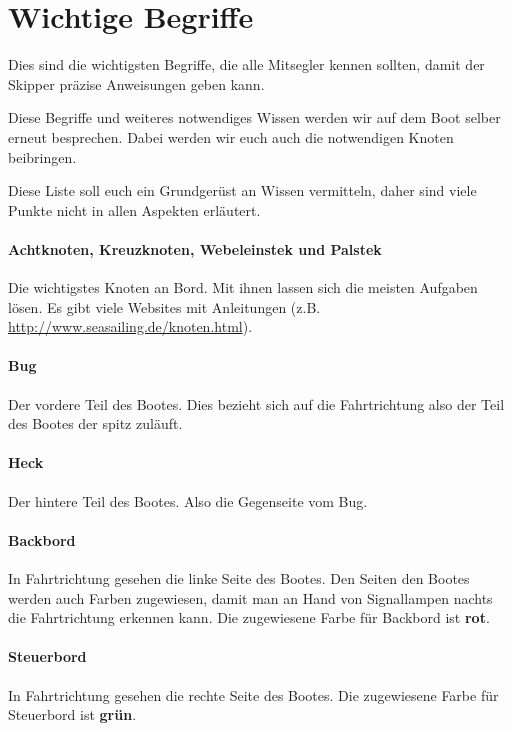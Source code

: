 \documentclass[12pt]{article}
\begin{document}

\section{Wichtige Begriffe}
Dies sind die wichtigsten Begriffe, die alle Mitsegler kennen sollten, damit der Skipper präzise Anweisungen geben kann.

Diese Begriffe und weiteres notwendiges Wissen werden wir auf dem Boot selber erneut besprechen. Dabei werden wir euch auch die notwendigen Knoten beibringen.

Diese Liste soll euch ein Grundgerüst an Wissen vermitteln, daher sind viele Punkte nicht in allen Aspekten erläutert.

\paragraph{Achtknoten, Kreuzknoten, Webeleinstek und Palstek}
Die wichtigstes Knoten an Bord. Mit ihnen lassen sich die meisten Aufgaben lösen.
Es gibt viele Websites mit Anleitungen (z.B. \href{http://www.seasailing.de/knoten.html}{http://www.seasailing.de/knoten.html}).

\paragraph{Bug}
Der vordere Teil des Bootes. Dies bezieht sich auf die Fahrtrichtung also der Teil des Bootes der spitz zuläuft.

\paragraph{Heck}
Der hintere Teil des Bootes. Also die Gegenseite vom Bug.

\paragraph{Backbord}
In Fahrtrichtung gesehen die linke Seite des Bootes. Den Seiten den Bootes werden auch Farben zugewiesen, damit man an Hand von Signallampen nachts die Fahrtrichtung erkennen kann. Die zugewiesene Farbe für Backbord ist \textbf{rot}.

\paragraph{Steuerbord}
In Fahrtrichtung gesehen die rechte Seite des Bootes. Die zugewiesene Farbe für Steuerbord ist \textbf{grün}.
\end{document}
